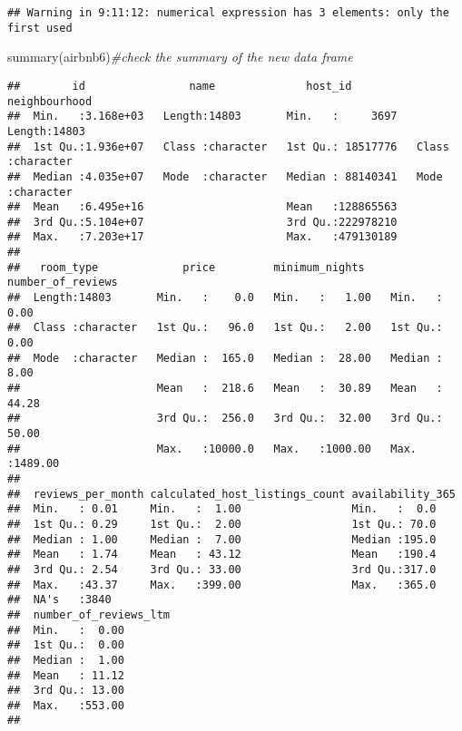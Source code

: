 \documentclass[
]{article}
\newenvironment{Shaded}{\begin{snugshade}}{\end{snugshade}}
\newcommand{\CommentTok}[1]{\textcolor[rgb]{0.56,0.35,0.01}{\textit{#1}}}
\newcommand{\FunctionTok}[1]{\textcolor[rgb]{0.00,0.00,0.00}{#1}}
\newcommand{\NormalTok}[1]{#1}
\begin{document}
\begin{verbatim}
## Warning in 9:11:12: numerical expression has 3 elements: only the first used
\end{verbatim}

\begin{Shaded}
\begin{Highlighting}[]
\FunctionTok{summary}\NormalTok{(airbnb6)}\CommentTok{\#check the summary of the new data frame}
\end{Highlighting}
\end{Shaded}

\begin{verbatim}
##        id                name              host_id          neighbourhood     
##  Min.   :3.168e+03   Length:14803       Min.   :     3697   Length:14803      
##  1st Qu.:1.936e+07   Class :character   1st Qu.: 18517776   Class :character  
##  Median :4.035e+07   Mode  :character   Median : 88140341   Mode  :character  
##  Mean   :6.495e+16                      Mean   :128865563                     
##  3rd Qu.:5.104e+07                      3rd Qu.:222978210                     
##  Max.   :7.203e+17                      Max.   :479130189                     
##                                                                               
##   room_type             price         minimum_nights    number_of_reviews
##  Length:14803       Min.   :    0.0   Min.   :   1.00   Min.   :   0.00  
##  Class :character   1st Qu.:   96.0   1st Qu.:   2.00   1st Qu.:   0.00  
##  Mode  :character   Median :  165.0   Median :  28.00   Median :   8.00  
##                     Mean   :  218.6   Mean   :  30.89   Mean   :  44.28  
##                     3rd Qu.:  256.0   3rd Qu.:  32.00   3rd Qu.:  50.00  
##                     Max.   :10000.0   Max.   :1000.00   Max.   :1489.00  
##                                                                          
##  reviews_per_month calculated_host_listings_count availability_365
##  Min.   : 0.01     Min.   :  1.00                 Min.   :  0.0   
##  1st Qu.: 0.29     1st Qu.:  2.00                 1st Qu.: 70.0   
##  Median : 1.00     Median :  7.00                 Median :195.0   
##  Mean   : 1.74     Mean   : 43.12                 Mean   :190.4   
##  3rd Qu.: 2.54     3rd Qu.: 33.00                 3rd Qu.:317.0   
##  Max.   :43.37     Max.   :399.00                 Max.   :365.0   
##  NA's   :3840                                                     
##  number_of_reviews_ltm
##  Min.   :  0.00       
##  1st Qu.:  0.00       
##  Median :  1.00       
##  Mean   : 11.12       
##  3rd Qu.: 13.00       
##  Max.   :553.00       
## 
\end{verbatim}
\end{document}
